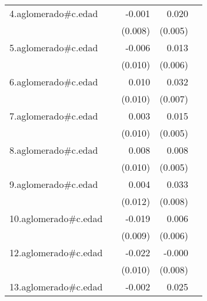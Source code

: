 {\begin{longtable}{l*{4}{D{.}{.}{-1}}}
\addlinespace
4.aglomerado#c.edad&                     &      -0.001         &       0.020\sym{***}&                     \\
            &                     &     (0.008)         &     (0.005)         &                     \\
\addlinespace
5.aglomerado#c.edad&                     &      -0.006         &       0.013\sym{*}  &                     \\
            &                     &     (0.010)         &     (0.006)         &                     \\
\addlinespace
6.aglomerado#c.edad&                     &       0.010         &       0.032\sym{***}&                     \\
            &                     &     (0.010)         &     (0.007)         &                     \\
\addlinespace
7.aglomerado#c.edad&                     &       0.003         &       0.015\sym{**} &                     \\
            &                     &     (0.010)         &     (0.005)         &                     \\
\addlinespace
8.aglomerado#c.edad&                     &       0.008         &       0.008         &                     \\
            &                     &     (0.010)         &     (0.005)         &                     \\
\addlinespace
9.aglomerado#c.edad&                     &       0.004         &       0.033\sym{***}&                     \\
            &                     &     (0.012)         &     (0.008)         &                     \\
\addlinespace
10.aglomerado#c.edad&                     &      -0.019\sym{*}  &       0.006         &                     \\
            &                     &     (0.009)         &     (0.006)         &                     \\
\addlinespace
12.aglomerado#c.edad&                     &      -0.022\sym{*}  &      -0.000         &                     \\
            &                     &     (0.010)         &     (0.008)         &                     \\
\addlinespace
13.aglomerado#c.edad&                     &      -0.002         &       0.025\sym{***}&                     \\

\end{longtable}}
